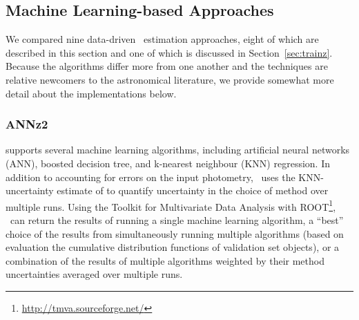 \subsection{Machine Learning-based Approaches}
\label{sec:trainingcodes}

We compared nine data-driven \pz\ estimation approaches, eight of which are described in this section and one of which is discussed in Section~\ref{sec:trainz}.
Because the algorithms differ more from one another and the techniques are relative newcomers to the astronomical literature, we provide somewhat more detail about the implementations below.


\subsubsection{ANNz2}
\label{sec:annz2}

\annz \citep{Sadeh:16} supports several machine learning algorithms, including artificial neural networks (ANN), boosted decision tree, and k-nearest neighbour (KNN) regression.
In addition to accounting for errors on the input photometry, \annz\ uses the KNN-uncertainty estimate of \citet{Oyaizu:08} to quantify uncertainty in the choice of method over multiple runs.
Using the Toolkit for Multivariate Data Analysis with ROOT\footnote{\url{http://tmva.sourceforge.net/}}, \annz\ can return the results of running a single machine learning algorithm, a ``best'' choice of the results from simultaneously running multiple algorithms (based on evaluation the cumulative distribution functions of validation set objects), or a combination of the results of multiple algorithms weighted by their method uncertainties averaged over multiple runs.


